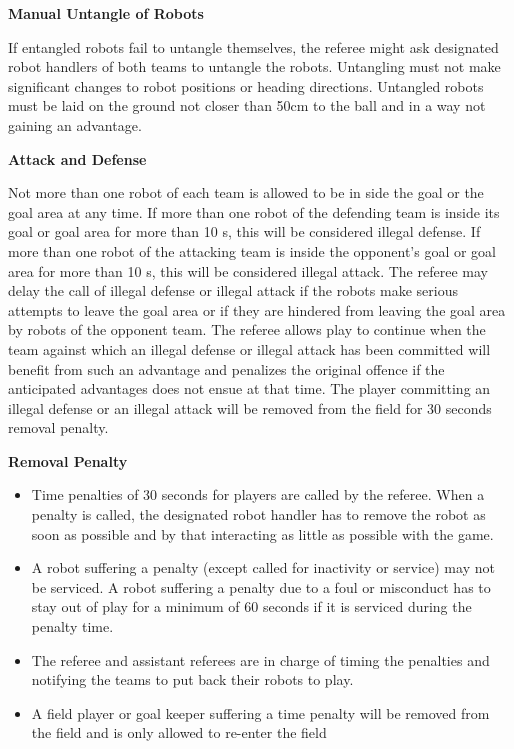\bigskip

{\bfseries Manual Untangle of Robots}

If entangled robots fail to untangle themselves, the referee might ask designated robot handlers of both teams to untangle the robots. Untangling must not make
significant changes to robot positions or heading directions. Untangled robots must be laid on the ground not closer than 50cm to the ball and in a way not gaining an advantage.

\bigskip

{\bfseries Attack and Defense}

Not more than one robot of each team is allowed to be in
side the goal or the goal area at any time. If more than one robot of the defending team is inside its goal or goal area for more than 10 s, this will be considered illegal defense. If more than one robot of the attacking team is inside the opponent's goal or goal area for more than 10 s, this will be considered illegal attack. The referee may delay the call of illegal defense
or illegal attack if the robots make serious attempts to leave the goal area or if they are hindered from leaving the goal area by robots of the opponent team. The referee allows play to continue when the team against
which an illegal defense or illegal attack has been committed will benefit from such an advantage and penalizes the original offence if the anticipated advantages does not ensue at that time. The player committing an illegal defense or an illegal attack will be removed from the field for 30 seconds removal penalty.

\bigskip

{\bfseries Removal Penalty}

\begin{itemize}
\item Time penalties of 30 seconds for players are called by the referee. When a penalty is called, the designated robot handler has to remove the robot as soon as possible and by that interacting as little as possible with the game. 
\item A robot suffering a penalty (except called for inactivity or service) may not be serviced. A robot suffering a penalty due to a foul or misconduct has to stay out of play for a minimum of 60 seconds if it is serviced during the penalty time.
\item The referee and assistant referees are in charge of timing the penalties and notifying the teams to put back their robots to play.
\item A field player or goal keeper suffering a time penalty will be removed from the field and is only allowed to re-enter the field \color{magenta}{from the team's own half of the field close to the penalty mark facing the opposite touch line, as indicated by the referee.}
\end{itemize}


